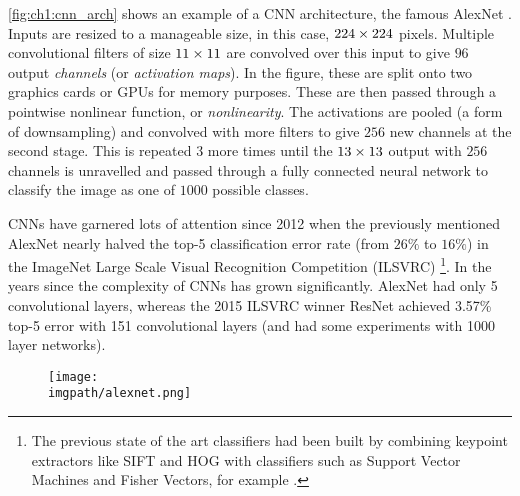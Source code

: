 \autoref{fig:ch1:cnn_arch} shows an example of a CNN
architecture, the famous AlexNet \cite{krizhevsky_imagenet_2012}. Inputs are resized to a
manageable size, in this case, $224\times 224$ pixels. Multiple convolutional
filters of size $11\times 11$ are convolved over this input to give $96$ output
\emph{channels} (or \emph{activation maps}). In the figure, these are split onto two
graphics cards or GPUs for memory purposes. These are then passed through a
pointwise nonlinear function, or \emph{nonlinearity}.
The activations are pooled (a form of downsampling) and convolved with more
filters to give $256$ new channels at the second stage. This is repeated 3 more
times until the $13\times 13$ output with $256$ channels is unravelled and passed
through a fully connected neural network to classify the image as one of $1000$
possible classes.

CNNs have garnered lots of attention since 2012 when the previously mentioned AlexNet
nearly halved the top-5 classification error rate (from $26\%$ to $16\%$)
in the ImageNet Large Scale Visual Recognition Competition (ILSVRC)
\cite{russakovsky_imagenet_2015}\footnote{The previous state of
the art classifiers had been built by combining keypoint extractors like
SIFT\cite{lowe_distinctive_2004} and HOG\cite{dalal_histograms_2005} with
classifiers such as Support Vector Machines\cite{cortes_support-vector_1995} and
Fisher Vectors\cite{sanchez_image_2013}, for example \cite{sanchez_high-dimensional_2011}.}.
In the years since the complexity of CNNs has grown significantly. AlexNet had
only 5 convolutional layers, whereas the 2015 ILSVRC winner ResNet \cite{he_deep_2016}
achieved 3.57\% top-5 error with 151 convolutional layers (and had some
experiments with 1000 layer networks).

\begin{figure}
  \centering
    \texttt{[image: \\imgpath/alexnet.png]}
    \label{fig:ch1:cnn_arch}
  \end{figure}

